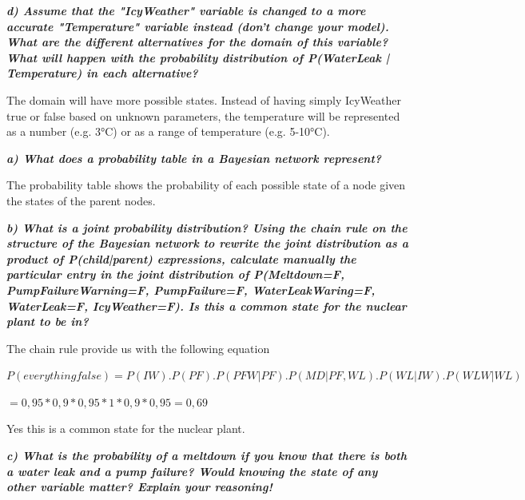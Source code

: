 \textit{\textbf{d) Assume that the "IcyWeather" variable is changed to a more accurate
"Temperature" variable instead (don't change your model). What are the different
 alternatives for the domain of this variable? What will happen with the
 probability distribution of P(WaterLeak | Temperature) in each alternative? }}

 \vspace{1em}

The domain will have more possible states. Instead of having simply IcyWeather true or
false based on unknown parameters, the temperature will be represented as a
number (e.g. 3°C) or as a range of temperature (e.g. 5-10°C).



\newpage
\thispagestyle{empty}

\textit{\textbf{a) What does a probability table in a Bayesian network represent?}}

\vspace{1em}

The probability table shows the probability of each possible state of a node given
the states of the parent nodes.


\textit{\textbf{b) What is a joint probability distribution? Using the chain
rule on the structure of the Bayesian network to rewrite the joint distribution
as a product of P(child|parent) expressions, calculate manually the particular
entry in the joint distribution of P(Meltdown=F, PumpFailureWarning=F,
PumpFailure=F, WaterLeakWaring=F, WaterLeak=F, IcyWeather=F).
Is this a common state for the nuclear plant to be in?}}

\vspace{1em}

The chain rule provide us with the following equation

$P(everything false) = P(IW).P(PF).P(PFW|PF).P(MD|PF, WL).P(WL|IW).P(WLW|WL)$

\hspace{9em}$= 0,95 * 0,9 * 0,95 * 1 * 0,9 * 0,95 = 0,69$

Yes this is a common state for the nuclear plant.

\textit{\textbf{c) What is the probability of a meltdown if you know that there
is both a water leak and a pump failure? Would knowing the state of any other
 variable matter? Explain your reasoning!}}

 \vspace{1em}

